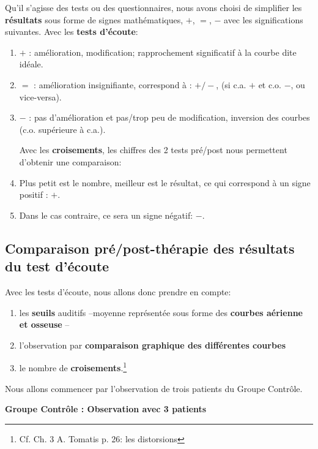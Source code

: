 Qu'il s'agisse des tests ou des questionnaires, nous avons choisi de
simplifier les \textbf{résultats} sous forme de signes
mathématiques, $+$, $=$, $-$ avec les significations suivantes.
Avec les \textbf{tests d'écoute}: 
\begin{enumerate}
\item$+$   : amélioration, modification;  rapprochement significatif à la courbe dite idéale.
\item$=$   : amélioration insignifiante, correspond à : $+/-$, (si c.a. $ + $ et c.o. $-$, ou vice-versa).

\item$-$   : pas d'amélioration et pas/trop peu  de modification, inversion
des courbes (c.o. supérieure à c.a.). 

  Avec les \textbf{croisements}, les chiffres des 2 tests pré/post
  nous permettent d'obtenir une comparaison: 
  \item Plus petit est le nombre, meilleur est le résultat, ce qui correspond à un signe positif : $+$.
\item Dans le
  cas contraire, ce sera un signe négatif: $-$.
  
\end{enumerate}


 \subsection{ Comparaison pré/post-thérapie des résultats du test d'écoute}
Avec les tests d'écoute, nous 
allons donc prendre en compte:

\begin{enumerate}
 \item   les \textbf{seuils} auditifs --moyenne
représentée sous forme des \textbf{courbes aérienne et osseuse} --
\item  l'observation par \textbf{comparaison graphique des différentes
  courbes}
\item le nombre de
\textbf{croisements}.\footnote{Cf. Ch. 3 A. Tomatis p. 26: les distorsions}
 
\end{enumerate}




  Nous allons commencer par l'observation de trois patients du Groupe Contrôle.
     

      \textbf{Groupe Contrôle : Observation avec 3 patients}
